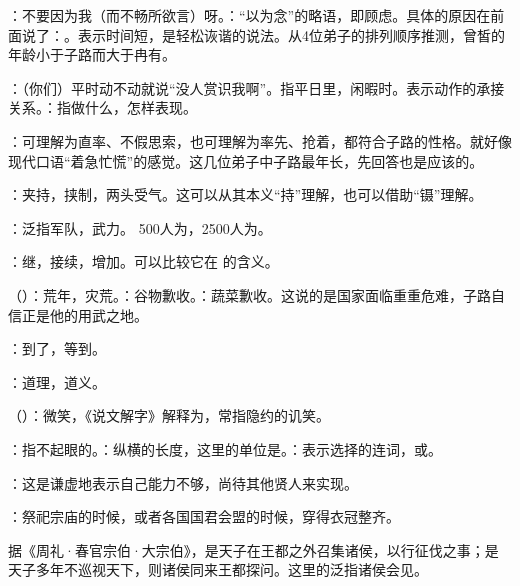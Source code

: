 {
\item {}：不要因为我（而不畅所欲言）呀。：“以为念”的略语，即顾虑。具体的原因在前面说了：。表示时间短，是轻松诙谐的说法。从4位弟子的排列顺序推测，曾皙的年龄小于子路而大于冉有。
\item {}：（你们）平时动不动就说“没人赏识我啊”。指平日里，闲暇时。表示动作的承接关系。：指做什么，怎样表现。
\item {}：可理解为直率、不假思索，也可理解为率先、抢着，都符合子路的性格。就好像现代口语“着急忙慌”的感觉。这几位弟子中子路最年长，先回答也是应该的。%
\item {}：夹持，挟制，两头受气。这可以从其本义“持”理解，也可以借助“镊”理解。
\item {}：泛指军队，武力。 500人为，2500人为。
\item {}：继，接续，增加。可以比较它在  的含义。
\item {}（）：荒年，灾荒。：谷物歉收。：蔬菜歉收。这说的是国家面临重重危难，子路自信正是他的用武之地。
\item {}：到了，等到。
\item {}：道理，道义。
\item {}（）：微笑，《说文解字》解释为，常指隐约的讥笑。
\item {}：指不起眼的。：纵横的长度，这里的单位是。：表示选择的连词，或。
\item {}：这是谦虚地表示自己能力不够，尚待其他贤人来实现。

\item {}：祭祀宗庙的时候，或者各国国君会盟的时候，穿得衣冠整齐。

据《周礼·春官宗伯·大宗伯》，是天子在王都之外召集诸侯，以行征伐之事；是天子多年不巡视天下，则诸侯同来王都探问。这里的泛指诸侯会见。

}
